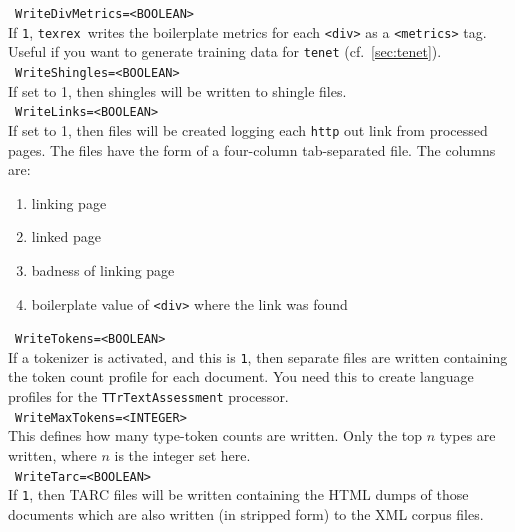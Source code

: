 \documentclass[12pt,a4paper]{article}
\newcommand{\trthis}{\texttt{texrex}}
\begin{document}
\noindent\textbullet~\texttt{WriteDivMetrics=<BOOLEAN>}\\

If \texttt{1}, \trthis\ writes the boilerplate metrics for each \texttt{<div>} as a \texttt{<metrics>} tag.
Useful if you want to generate training data for \texttt{tenet} (cf.\ \ref{sec:tenet}).\\

\noindent\textbullet~\texttt{WriteShingles=<BOOLEAN>}\\

If set to 1, then shingles will be written to shingle files.\\

\noindent\textbullet~\texttt{WriteLinks=<BOOLEAN>}\\

If set to 1, then files will be created logging each \texttt{http} out link from processed pages.
The files have the form of a four-column tab-separated file.
The columns are:

\begin{enumerate}
  \item linking page
  \item linked page
  \item badness of linking page
  \item boilerplate value of \texttt{<div>} where the link was found
\end{enumerate}

\noindent\textbullet~\texttt{WriteTokens=<BOOLEAN>}\\

If a tokenizer is activated, and this is \texttt{1}, then separate files are written containing the token count profile for each document.
You need this to create language profiles for the \texttt{TTrTextAssessment} processor.\\

\noindent\textbullet~\texttt{WriteMaxTokens=<INTEGER>}\\

This defines how many type-token counts are written.
Only the top $n$ types are written, where $n$ is the integer set here.\\

\noindent\textbullet~\texttt{WriteTarc=<BOOLEAN>}\\

If \texttt{1}, then TARC files will be written containing the HTML dumps of those documents which are also written (in stripped form) to the XML corpus files.\\
\end{document}

